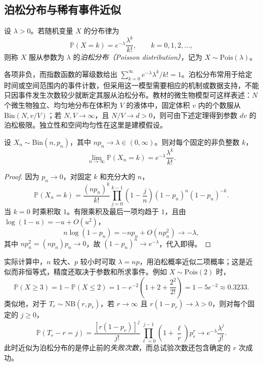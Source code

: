 \subsection{泊松分布与稀有事件近似}
\label{subsec:study-poisson}

\begin{definition}
\label{def:study-poisson}
设 $\lambda>0$。若随机变量 $X$ 的分布律为
\begin{equation}
  \mathbb P(X=k)=e^{-\lambda}\frac{\lambda^k}{k!},
  \qquad k=0,1,2,\ldots,
  \label{eq:study-poisson-mass}
\end{equation}
则称 $X$ 服从参数为 $\lambda$ 的\emph{泊松分布（Poisson distribution）}，记为 $X\sim\mathrm{Pois}(\lambda)$。
\end{definition}

各项非负，而指数函数的幂级数给出 $\sum_{k=0}^{\infty}e^{-\lambda}\lambda^k/k!=1$。泊松分布常用于给定时间或空间范围内的事件计数，但采用这一模型需要相应的机制或数据支持，不能只因事件发生次数较少就断定其服从泊松分布。教材的微生物模型可这样表述：$N$ 个微生物独立、均匀地分布在体积为 $V$ 的液体中，固定体积 $v$ 内的个数服从 $\mathrm{Bin}(N,v/V)$；若 $N,V\to\infty$，且 $N/V\to d>0$，则可由下述定理得到参数 $dv$ 的泊松极限。独立性和空间均匀性在这里是建模假设。

\begin{theorem}[泊松逼近定理]
\label{thm:study-poisson-limit}
设 $X_n\sim\mathrm{Bin}(n,p_n)$，其中 $np_n\to\lambda\in(0,\infty)$。则对每个固定的非负整数 $k$，
\begin{equation}
  \lim_{n\to\infty}\mathbb P(X_n=k)
  =e^{-\lambda}\frac{\lambda^k}{k!}.
  \label{eq:study-poisson-limit}
\end{equation}
\end{theorem}

\begin{proof}
因为 $p_n\to0$，对固定 $k$ 和充分大的 $n$，
\[
  \mathbb P(X_n=k)
  =\frac{(np_n)^k}{k!}
    \prod_{j=0}^{k-1}\left(1-\frac jn\right)
    (1-p_n)^n(1-p_n)^{-k}.
\]
当 $k=0$ 时乘积取 $1$。有限乘积及最后一项均趋于 $1$，且由 $\log(1-u)=-u+O(u^2)$，
\[
  n\log(1-p_n)=-np_n+O(np_n^2)\longrightarrow-\lambda,
\]
其中 $np_n^2=(np_n)p_n\to0$，故 $(1-p_n)^n\to e^{-\lambda}$，代入即得。
\end{proof}

实际计算中，$n$ 较大、$p$ 较小时可取 $\lambda=np$，用泊松概率近似二项概率；这是近似而非恒等式，精度还取决于参数和所求事件。例如 $X\sim\mathrm{Pois}(2)$ 时，
\[
  \mathbb P(X\ge3)=1-\mathbb P(X\le2)
  =1-e^{-2}\left(1+2+\frac{2^2}{2!}\right)
  =1-5e^{-2}\approx0.3233.
\]
类似地，对于 $T_r\sim\mathrm{NB}(r,p_r)$，若 $r\to\infty$ 且 $r(1-p_r)\to\lambda>0$，则对每个固定的 $j\ge0$，
\[
  \mathbb P(T_r-r=j)
  =\frac{[r(1-p_r)]^j}{j!}
    \prod_{\ell=0}^{j-1}\left(1+\frac\ell r\right)p_r^r
  \longrightarrow e^{-\lambda}\frac{\lambda^j}{j!}.
\]
此时近似为泊松分布的是停止前的\emph{失败次数}，而总试验次数还包含确定的 $r$ 次成功。

